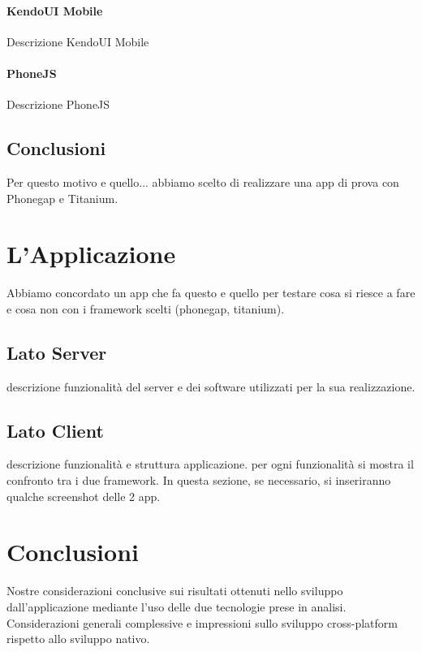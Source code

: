 				\subsubsection{KendoUI Mobile}
					Descrizione KendoUI Mobile
	
				\subsubsection{PhoneJS}
					Descrizione PhoneJS

	\section{Conclusioni}
		Per questo motivo e quello... abbiamo scelto di realizzare una app di 
		prova con Phonegap e Titanium.


\chapter{L'Applicazione}
	Abbiamo concordato un app che fa questo e quello per testare cosa si riesce
	a fare e cosa non con i framework scelti (phonegap, titanium).
	
	\section{Lato Server}
		descrizione funzionalità del server e dei software utilizzati per la sua
		realizzazione.
	
	\section{Lato Client}
		descrizione funzionalità e struttura applicazione. per ogni funzionalità
		si mostra il confronto tra i due framework. In questa sezione, se 
		necessario, si inseriranno qualche screenshot delle 2 app.

\chapter{Conclusioni}
	Nostre considerazioni conclusive sui risultati ottenuti nello sviluppo 
	dall'applicazione mediante l'uso delle due tecnologie prese in analisi. 
	Considerazioni generali complessive e impressioni sullo sviluppo 
	cross-platform rispetto allo sviluppo nativo.
